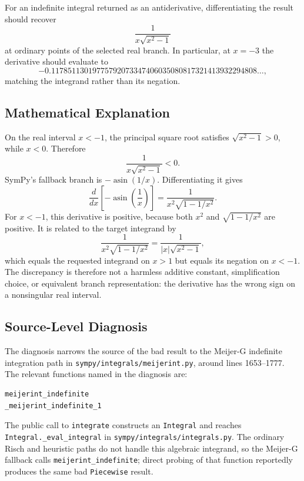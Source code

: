 \documentclass[11pt]{article}
\begin{document}
For an indefinite integral returned as an antiderivative, differentiating the
result should recover
\[
    \dfrac{1}{x\sqrt{x^2-1}}
\]
at ordinary points of the selected real branch.  In particular, at \(x=-3\) the
derivative should evaluate to
\[
    -0.11785113019775792073347406035080817321413932294808\ldots,
\]
matching the integrand rather than its negation.

\subsection{Mathematical Explanation}

On the real interval \(x<-1\), the principal square root satisfies
\(\sqrt{x^2-1}>0\), while \(x<0\).  Therefore
\[
    \dfrac{1}{x\sqrt{x^2-1}} < 0 .
\]
SymPy's fallback branch is \(-\operatorname{asin}(1/x)\).  Differentiating it gives
\[
    \dfrac{d}{dx}\left[-\operatorname{asin}\left(\dfrac{1}{x}\right)\right]
    =
    \dfrac{1}{x^2\sqrt{1-1/x^2}} .
\]
For \(x<-1\), this derivative is positive, because both \(x^2\) and
\(\sqrt{1-1/x^2}\) are positive.  It is related to the target integrand by
\[
    \dfrac{1}{x^2\sqrt{1-1/x^2}}
    =
    \dfrac{1}{|x|\sqrt{x^2-1}},
\]
which equals the requested integrand on \(x>1\) but equals its negation on
\(x<-1\).  The discrepancy is therefore not a harmless additive constant,
simplification choice, or equivalent branch representation: the derivative has
the wrong sign on a nonsingular real interval.

\subsection{Source-Level Diagnosis}

The diagnosis narrows the source of the bad result to the Meijer-G indefinite
integration path in \nolinkurl{sympy/integrals/meijerint.py}, around lines
1653--1777.  The relevant functions named in the diagnosis are:

\begin{lstlisting}[style=bugpython]
meijerint_indefinite
_meijerint_indefinite_1
\end{lstlisting}

The public call to \texttt{integrate} constructs an \texttt{Integral} and reaches
\nolinkurl{Integral._eval_integral} in
\nolinkurl{sympy/integrals/integrals.py}.  The ordinary Risch and heuristic
paths do not handle this algebraic integrand, so the Meijer-G fallback calls
\texttt{meijerint\_indefinite}; direct probing of that function reportedly
produces the same bad \texttt{Piecewise} result.
\end{document}
